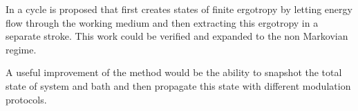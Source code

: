 In \cite{Santos2021Jun} a cycle is proposed that first creates states
of finite ergotropy by letting energy flow through the working medium
and then extracting this ergotropy in a separate stroke. This work
could be verified and expanded to the non Markovian regime.

A useful improvement of the method would be the ability to snapshot
the total state of system and bath and then propagate this state with
different modulation protocols.

